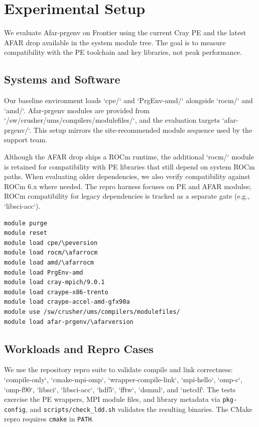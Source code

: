 \section{Experimental Setup}
\label{sec:setup}
We evaluate Afar-prgenv on Frontier using the current Cray PE and the latest
AFAR drop available in the system module tree. The goal is to measure
compatibility with the PE toolchain and key libraries, not peak performance.

\subsection{Systems and Software}
\label{sec:systems}
Our baseline environment loads `cpe/\peversion` and `PrgEnv-amd/\prgenvversion`
alongside `rocm/\afarrocm` and `amd/\afarrocm`. Afar-prgenv modules are provided
from `/sw/crusher/ums/compilers/modulefiles/`, and the evaluation targets
`afar-prgenv/\afarversion`. This setup mirrors the site-recommended module
sequence used by the support team.

Although the AFAR drop ships a ROCm runtime, the additional `rocm/\afarrocm`
module is retained for compatibility with PE libraries that still depend on
system ROCm paths. When evaluating older dependencies, we also verify
compatibility against ROCm 6.x where needed.
The repro harness focuses on PE and AFAR modules; ROCm compatibility for
legacy dependencies is tracked as a separate gate (e.g., `libsci-acc`).

\begin{verbatim}
module purge
module reset
module load cpe/\peversion
module load rocm/\afarrocm
module load amd/\afarrocm
module load PrgEnv-amd
module load cray-mpich/9.0.1
module load craype-x86-trento
module load craype-accel-amd-gfx90a
module use /sw/crusher/ums/compilers/modulefiles/
module load afar-prgenv/\afarversion
\end{verbatim}

\subsection{Workloads and Repro Cases}
\label{sec:workloads}
We use the repository repro suite to validate compile and link correctness:
`compile-only`, `cmake-mpi-omp`, `wrapper-compile-link`, `mpi-hello`, `omp-c`,
`omp-f90`, `libsci`, `libsci-acc`, `hdf5`, `fftw`, `dsmml`, and `netcdf`. The
tests exercise the PE wrappers, MPI module files, and library metadata via
\texttt{pkg-config}, and \texttt{scripts/\allowbreak check\_ldd.sh} validates the
resulting binaries.
The CMake repro requires \texttt{cmake} in \texttt{PATH}.

